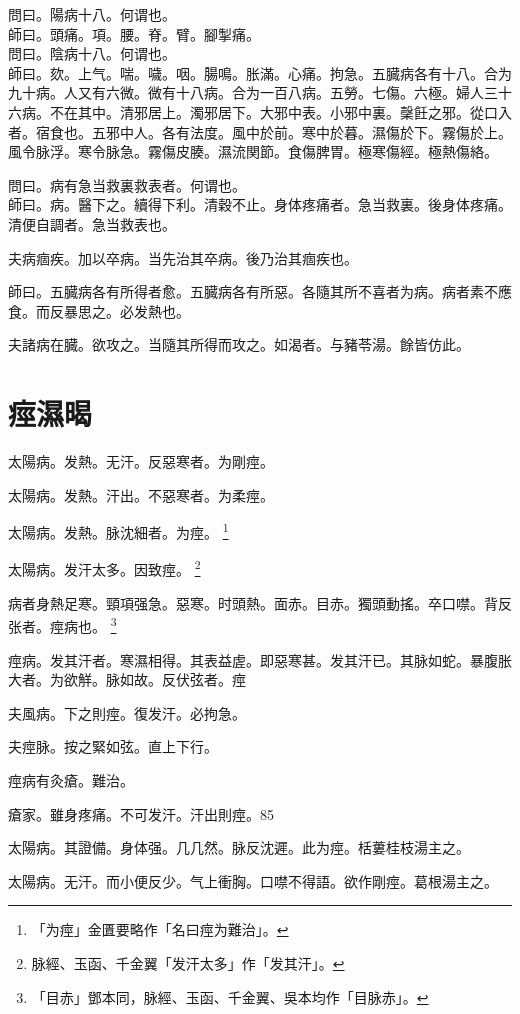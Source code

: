\documentclass[12pt,twoside,UTF8,b5paper]{ctexbook}
\begin{document}
問曰。陽病十八。何谓也。\\
師曰。頭痛。項。腰。脊。臂。腳掣痛。\\
問曰。陰病十八。何谓也。\\
師曰。欬。上气。喘。噦。咽。腸鳴。胀滿。心痛。拘急。五臓病各有十八。合为九十病。人又有六微。微有十八病。合为一百八病。五勞。七傷。六極。婦人三十六病。不在其中。清邪居上。濁邪居下。大邪中表。小邪中裏。䅽飪之邪。從口入者。宿食也。五邪中人。各有法度。風中於前。寒中於暮。濕傷於下。霧傷於上。風令脉浮。寒令脉急。霧傷皮腠。濕流関節。食傷脾胃。極寒傷經。極熱傷絡。

問曰。病有急当救裏救表者。何谓也。\\
師曰。病。醫下之。續得下利。清穀不止。身体疼痛者。急当救裏。後身体疼痛。清便自調者。急当救表也。

夫病痼疾。加以卒病。当先治其卒病。後乃治其痼疾也。

師曰。五臓病各有所得者愈。五臓病各有所惡。各隨其所不喜者为病。病者素不應食。而反暴思之。必发熱也。

夫諸病在臓。欲攻之。当隨其所得而攻之。如渴者。与豬苓湯。餘皆仿此。

\chapter{痙濕暍}

太陽病。发熱。无汗。反惡寒者。为剛痙。

太陽病。发熱。汗出。不惡寒者。为柔痙。

太陽病。发熱。脉沈細者。为痙。
	\footnote{「为痙」金匱要略作「名曰痙为難治」。}

太陽病。发汗太多。因致痙。
	\footnote{脉經、玉函、千金翼「发汗太多」作「发其汗」。}

病者身熱足寒。頸項强急。惡寒。时頭熱。面赤。目赤。獨頭動搖。卒口噤。背反张者。痙病也。
	\footnote{「目赤」鄧本同，脉經、玉函、千金翼、吳本均作「目脉赤」。}

痙病。发其汗者。寒濕相得。其表益虗。即惡寒甚。发其汗已。其脉如蛇。暴腹胀大者。为欲觧。脉如故。反伏弦者。痙

夫風病。下之則痙。復发汗。必拘急。

夫痙脉。按之緊如弦。直上下行。

痙病有灸瘡。難治。

瘡家。雖身疼痛。不可发汗。汗出則痙。85

太陽病。其證備。身体强。几几然。脉反沈遲。此为痙。栝蔞桂枝湯主之。

太陽病。无汗。而小便反少。气上衝胸。口噤不得語。欲作剛痙。葛根湯主之。
\end{document}
